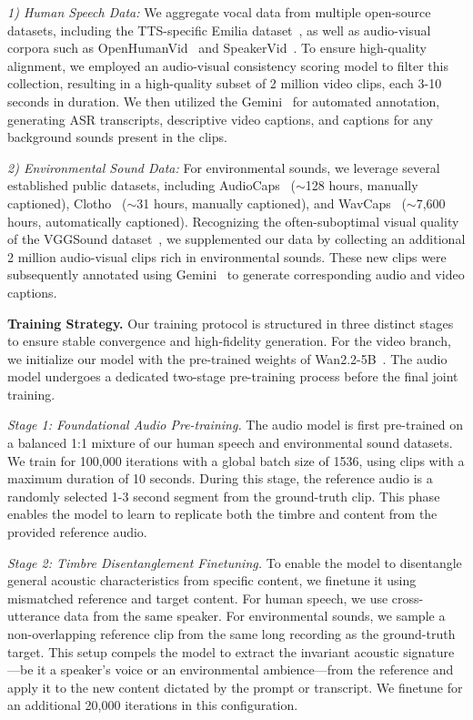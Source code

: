 \textit{1) Human Speech Data:} We aggregate vocal data from multiple open-source datasets, including the TTS-specific Emilia dataset~\cite{he2024emilia}, as well as audio-visual corpora such as OpenHumanVid~\cite{li2025openhumanvid} and SpeakerVid~\cite{zhang2025speakervid}. To ensure high-quality alignment, we employed an audio-visual consistency scoring model to filter this collection, resulting in a high-quality subset of 2 million video clips, each 3-10 seconds in duration. We then utilized the Gemini~\cite{gemini_website} for automated annotation, generating ASR transcripts, descriptive video captions, and captions for any background sounds present in the clips.

\textit{2) Environmental Sound Data:} For environmental sounds, we leverage several established public datasets, including AudioCaps~\cite{kim2019audiocaps} ($\sim$128 hours, manually captioned), Clotho~\cite{drossos2020clotho} ($\sim$31 hours, manually captioned), and WavCaps~\cite{mei2024wavcaps} ($\sim$7,600 hours, automatically captioned). Recognizing the often-suboptimal visual quality of the VGGSound dataset~\cite{chen2020vggsound}, we supplemented our data by collecting an additional 2 million audio-visual clips rich in environmental sounds. These new clips were subsequently annotated using Gemini~\cite{gemini_website} to generate corresponding audio and video captions.

\noindent\textbf{Training Strategy.}
Our training protocol is structured in three distinct stages to ensure stable convergence and high-fidelity generation. For the video branch, we initialize our model with the pre-trained weights of Wan2.2-5B~\cite{wan}. The audio model undergoes a dedicated two-stage pre-training process before the final joint training.

\textit{Stage 1: Foundational Audio Pre-training.}
The audio model is first pre-trained on a balanced 1:1 mixture of our human speech and environmental sound datasets. We train for 100,000 iterations with a global batch size of 1536, using clips with a maximum duration of 10 seconds. During this stage, the reference audio is a randomly selected 1-3 second segment from the ground-truth clip. This phase enables the model to learn to replicate both the timbre and content from the provided reference audio.

\textit{Stage 2: Timbre Disentanglement Finetuning.}
To enable the model to disentangle general acoustic characteristics from specific content, we finetune it using mismatched reference and target content. For human speech, we use cross-utterance data from the same speaker. For environmental sounds, we sample a non-overlapping reference clip from the same long recording as the ground-truth target. This setup compels the model to extract the invariant acoustic signature—be it a speaker's voice or an environmental ambience—from the reference and apply it to the new content dictated by the prompt or transcript. We finetune for an additional 20,000 iterations in this configuration.

